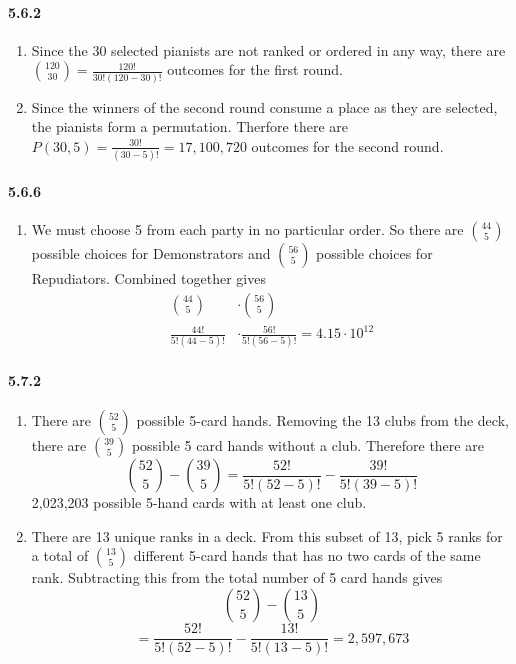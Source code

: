 \documentclass[11pt, letterpaper, twocolumn, fleqn]{article}
\begin{document}
\paragraph{5.6.2}
\begin{enumerate}
  \item Since the 30 selected pianists are not ranked or ordered in any way, there are $\binom{120}{30} = \frac{120!}{30!(120-30)!}$ outcomes for the first round.
  \item Since the winners of the second round consume a place as they are selected, the pianists form a permutation. Therfore there are $P(30,5) = \frac{30!}{(30-5)!}=17,100,720$ outcomes for the second round.
\end{enumerate}

\paragraph{5.6.6}
\begin{enumerate}
  \item We must choose 5 from each party in no particular order. So there are $\binom{44}{5}$ possible choices for Demonstrators and $\binom{56}{5}$ possible choices for Repudiators. Combined together gives 
    \begin{align*}
      \binom{44}{5} &\cdot \binom{56}{5} \\
      \frac{44!}{5!(44-5)!} &\cdot \frac{56!}{5!(56-5)!} = 4.15\cdot10^{12}
    \end{align*}
\end{enumerate}

\paragraph{5.7.2}
\begin{enumerate}
  \item There are $\binom{52}{5}$ possible 5-card hands. Removing the 13 clubs from the deck, there are $\binom{39}{5}$ possible 5 card hands without a club. Therefore there are 
    $$\binom{52}{5} - \binom{39}{5} = \frac{52!}{5!(52-5)!} - \frac{39!}{5!(39-5)!}$$
  2,023,203 possible 5-hand cards with at least one club.
  \item There are 13 unique ranks in a deck. From this subset of 13, pick 5 ranks for a total of $\binom{13}{5}$ different 5-card hands that has no two cards of the same rank. Subtracting this from the total number of 5 card hands gives
    $$\binom{52}{5} - \binom{13}{5} $$
    $$= \frac{52!}{5!(52-5)!} - \frac{13!}{5!(13-5)!} = 2,597,673$$
\end{enumerate}
\end{document}
